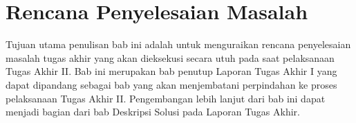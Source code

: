 \chapter{Rencana Penyelesaian Masalah}

Tujuan utama penulisan bab ini adalah untuk menguraikan rencana penyelesaian masalah tugas akhir yang akan dieksekusi secara utuh pada saat pelaksanaan Tugas Akhir II. Bab ini merupakan bab penutup Laporan Tugas Akhir I yang dapat dipandang sebagai bab yang akan menjembatani perpindahan ke proses pelaksanaan Tugas Akhir II. Pengembangan lebih lanjut dari bab ini dapat menjadi bagian dari bab Deskripsi Solusi pada Laporan Tugas Akhir.
